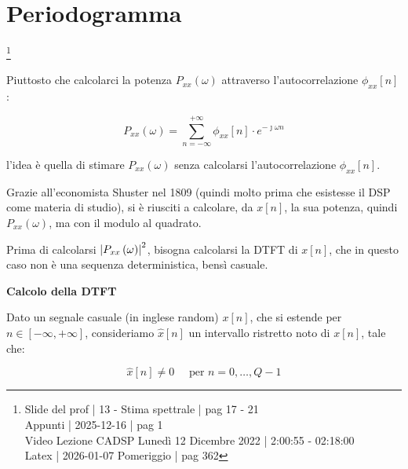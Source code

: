 \newpage 

\section{Periodogramma}

\footnote{ 
    Slide del prof | 13 - Stima spettrale | pag 17 - 21\\
    Appunti | 2025-12-16 | pag 1\\
    Video Lezione CADSP Lunedì 12 Dicembre 2022 | 2:00:55  - 02:18:00 \\
    Latex | 2026-01-07 Pomeriggio | pag 362 
}

Piuttosto che calcolarci la potenza $P_{xx} \left(\omega\right)$ attraverso l'autocorrelazione $\phi_{xx} \left[ n\right]$: 

{
    \Large 
    \begin{equation}
        P_{xx} \left(\omega\right)
        = 
        \sum_{n = - \infty}^{+ \infty}
        \phi_{xx} \left[ n\right]  \cdot e^{- \jmath \omega n}
    \end{equation}
}

l'idea è quella di stimare $P_{xx} \left(\omega\right)$ senza calcolarsi l'autocorrelazione $\phi_{xx} \left[ n\right]$. \newline 

Grazie all'economista Shuster nel 1809 (quindi molto prima che esistesse il DSP come materia di studio), si è riusciti a calcolare, da $x \left[ n\right]$, la sua potenza, 
quindi $P_{xx} \left(\omega\right)$, ma con il modulo al quadrato. \newline 

Prima di calcolarsi $\abs{P_{xx} \left(\omega\right)}^{2}$, bisogna calcolarsi la DTFT di $x \left[ n\right]$, che in questo caso non è una sequenza deterministica, bensì casuale. \newline 

\textbf{Calcolo della DTFT} \newline 

Dato un segnale casuale (in inglese random) $x \left[ n\right]$, che si estende per $n \in \left[ - \infty, + \infty\right]$, consideriamo $\hat{x} \left[ n\right]$ un intervallo ristretto noto di $x \left[ n\right]$, tale che: 

{
    \Large 
    \begin{equation}
        \hat{x} \left[ n\right]
        \neq 0 
        \quad 
        \text{ per }
        n = 0, \dots, Q - 1 
    \end{equation}
}

